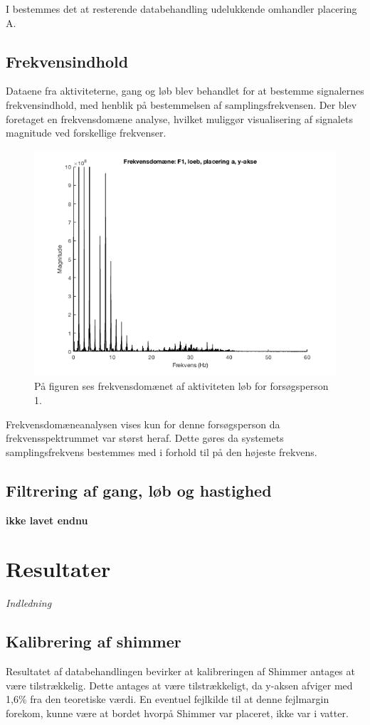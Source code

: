 I  bestemmes det at resterende databehandling udelukkende omhandler placering A.


\subsection{Frekvensindhold}
Dataene fra aktiviteterne, gang og løb blev behandlet for at bestemme signalernes frekvensindhold, med henblik på bestemmelsen af samplingsfrekvensen. Der blev foretaget en frekvensdomæne analyse, hvilket muliggør visualisering af signalets magnitude ved forskellige frekvenser. 

\begin{figure}[H]
	\centering
	\includegraphics[scale=0.68]{figures/bProblemloesning/fft_f1_loeb}
	\caption{På figuren ses frekvensdomænet af aktiviteten løb for forsøgsperson 1.}
	\label{fig:Ap_FFt}
\end{figure}
Frekvensdomæneanalysen vises kun for denne forsøgsperson da frekvensspektrummet var størst heraf. Dette gøres da systemets samplingsfrekvens bestemmes med i forhold til på den højeste frekvens.

\subsection{Filtrering af gang, løb og hastighed}
\textbf{ikke lavet endnu}

\section{Resultater}
\textit{Indledning}
\subsection{Kalibrering af shimmer}
Resultatet af databehandlingen bevirker at kalibreringen af Shimmer antages at være tilstrækkelig. Dette antages at være tilstrækkeligt, da y-aksen  afviger med 1,6\% fra den teoretiske værdi. En eventuel fejlkilde til at denne fejlmargin forekom, kunne være at bordet hvorpå Shimmer var placeret, ikke var i vatter.

